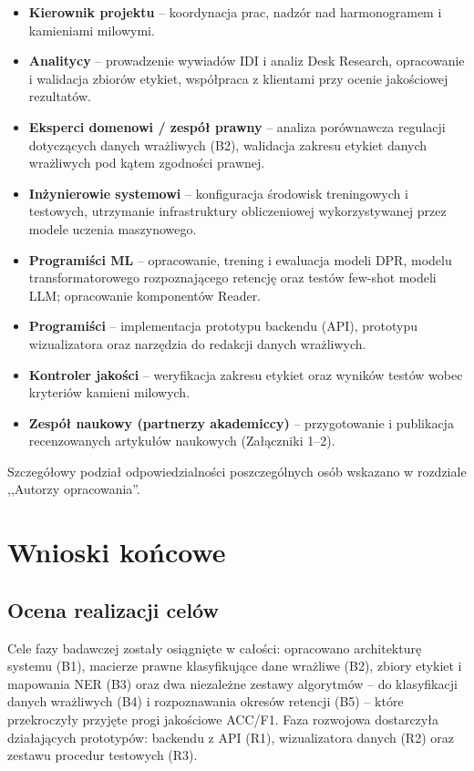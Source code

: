 \documentclass[12pt,a4paper]{report}
\begin{document}
\begin{itemize}
    \item \textbf{Kierownik projektu} -- koordynacja prac, nadzór nad harmonogramem i kamieniami milowymi.
    \item \textbf{Analitycy} -- prowadzenie wywiadów IDI i analiz Desk Research, opracowanie i walidacja zbiorów etykiet, współpraca z klientami przy ocenie jakościowej rezultatów.
    \item \textbf{Eksperci domenowi / zespół prawny} -- analiza porównawcza regulacji dotyczących danych wrażliwych (B2), walidacja zakresu etykiet danych wrażliwych pod kątem zgodności prawnej.
    \item \textbf{Inżynierowie systemowi} -- konfiguracja środowisk treningowych i testowych, utrzymanie infrastruktury obliczeniowej wykorzystywanej przez modele uczenia maszynowego.
    \item \textbf{Programiści ML} -- opracowanie, trening i ewaluacja modeli DPR, modelu transformatorowego rozpoznającego retencję oraz testów few-shot modeli LLM; opracowanie komponentów Reader.
    \item \textbf{Programiści} -- implementacja prototypu backendu (API), prototypu wizualizatora oraz narzędzia do redakcji danych wrażliwych.
    \item \textbf{Kontroler jakości} -- weryfikacja zakresu etykiet oraz wyników testów wobec kryteriów kamieni milowych.
    \item \textbf{Zespół naukowy (partnerzy akademiccy)} -- przygotowanie i publikacja recenzowanych artykułów naukowych (Załączniki 1--2).
\end{itemize}

Szczegółowy podział odpowiedzialności poszczególnych osób wskazano w rozdziale ,,Autorzy opracowania''.

\chapter{Wnioski końcowe}
\section{Ocena realizacji celów}
Cele fazy badawczej zostały osiągnięte w całości: opracowano architekturę systemu (B1), macierze prawne klasyfikujące dane wrażliwe (B2), zbiory etykiet i mapowania NER (B3) oraz dwa niezależne zestawy algorytmów -- do klasyfikacji danych wrażliwych (B4) i rozpoznawania okresów retencji (B5) -- które przekroczyły przyjęte progi jakościowe ACC/F1. Faza rozwojowa dostarczyła działających prototypów: backendu z API (R1), wizualizatora danych (R2) oraz zestawu procedur testowych (R3).
\end{document}
